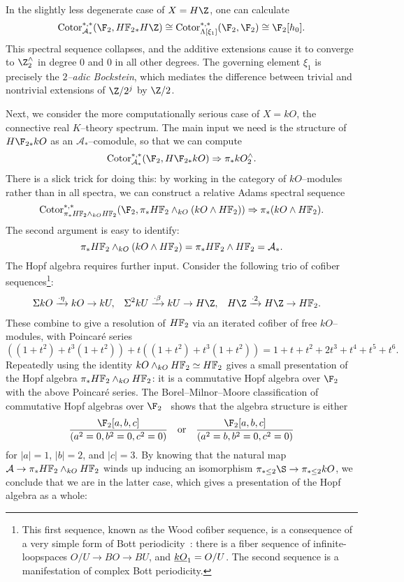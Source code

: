 \begin{example}
In the slightly less degenerate case of \(X = H\Z\), one can calculate \[\Cotor^{*, *}_{\mathcal A_*}(\F_2, \HFtwo_* H\Z) \cong \Cotor^{*, *}_{\Lambda[\xi_1]}(\F_2, \F_2) \cong \F_2[h_0].\]  This spectral sequence collapses, and the additive extensions cause it to converge to \(\Z^\wedge_2\) in degree \(0\) and \(0\) in all other degrees.  The governing element \(\xi_1\) is precisely the \textit{\(2\)--adic Bockstein}, which mediates the difference between trivial and nontrivial extensions of \(\Z/2^j\) by \(\Z/2\).
\end{example}

\begin{example}\label{kOASSExample}
Next, we consider the more computationally serious case of \(X = kO\), the connective real \(K\)--theory spectrum.  The main input we need is the structure of \(H\F_{2*} kO\) as an \(\mathcal A_*\)--comodule, so that we can compute \[\Cotor_{\mathcal A_*}^{*, *}(\F_2, H\F_{2*} kO) \Rightarrow \pi_* kO^\wedge_2.\]  There is a slick trick for doing this: by working in the category of \(kO\)--modules rather than in all spectra, we can construct a relative Adams spectral sequence \[\Cotor_{\pi_* \HFtwo \sm_{kO} \HFtwo}^{*, *}(\F_2, \pi_* \HFtwo \sm_{kO}(kO \sm \HFtwo)) \Rightarrow \pi_*(kO \sm \HFtwo).\]  The second argument is easy to identify: \[\pi_* \HFtwo \sm_{kO}(kO \sm \HFtwo) = \pi_* \HFtwo \sm \HFtwo = \mathcal A_*.\]  The Hopf algebra requires further input.  Consider the following trio of cofiber sequences\footnote{This first sequence, known as the Wood cofiber sequence, is a consequence of a very simple form of Bott periodicity~\cite[Section 5]{Harris}: there is a fiber sequence of infinite-loopspaces \(O/U \to BO \to BU\), and \(\OS{kO}{1} = O/U\).  The second sequence is a manifestation of complex Bott periodicity.}:
\begin{align*}
\Susp kO & \xrightarrow{\cdot \eta} kO \to kU, &
\Susp^2 kU & \xrightarrow{\cdot \beta} kU \to H\Z, &
H\Z & \xrightarrow{\cdot 2} H\Z \to \HFtwo.
\end{align*}
These combine to give a resolution of \(\HFtwo\) via an iterated cofiber of free \(kO\)--modules, with Poincar\'e series \[((1 + t^2) + t^3(1 + t^2)) + t((1 + t^2) + t^3(1 + t^2)) = 1 + t + t^2 + 2t^3 + t^4 + t^5 + t^6.\]  Repeatedly using the identity \(kO \sm_{kO} \HFtwo \simeq \HFtwo\) gives a small presentation of the Hopf algebra \(\pi_* \HFtwo \sm_{kO} \HFtwo\): it is a commutative Hopf algebra over \(\F_2\) with the above Poincar\'e series.  The Borel--Milnor--Moore classification of commutative Hopf algebras over \(\F_2\)~\cite[Theorem 7.11]{MilnorMoore} shows that the algebra structure is either \[\frac{\F_2[a, b, c]}{(a^2 = 0, b^2 = 0, c^2 = 0)} \quad \text{or} \quad \frac{\F_2[a, b, c]}{(a^2 = b, b^2 = 0, c^2 = 0)}\] for \(|a| = 1\), \(|b| = 2\), and \(|c| = 3\).  By knowing that the natural map \(\mathcal A \to \pi_* \HFtwo \sm_{kO} \HFtwo\) winds up inducing an isomorphism \(\pi_{* \le 2} \S \to \pi_{* \le 2} kO\), we conclude that we are in the latter case, which gives a presentation of the Hopf algebra as a whole:

\end{example}
